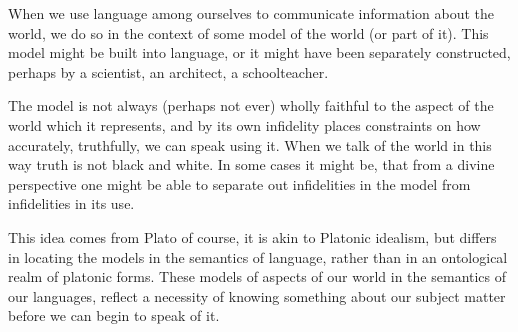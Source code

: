 When we use language among ourselves to communicate information about the world, we do so in the context of some model of the world (or part of it).
This model might be built into language, or it might have been separately constructed, perhaps by a scientist, an architect, a schoolteacher.

The model is not always (perhaps not ever) wholly faithful to the aspect of the world which it represents, and by its own infidelity places constraints on how accurately, truthfully, we can speak using it.
When we talk of the world in this way truth is not black and white.
In some cases it might be, that from a divine perspective one might be able to separate out infidelities in the model from infidelities in its use.

This idea comes from Plato of course, it is akin to Platonic idealism, but differs in locating the models in the semantics of language, rather than in an ontological realm of platonic forms.
These models of aspects of our world in the semantics of our languages, reflect a necessity of knowing something about our subject matter before we can begin to speak of it.